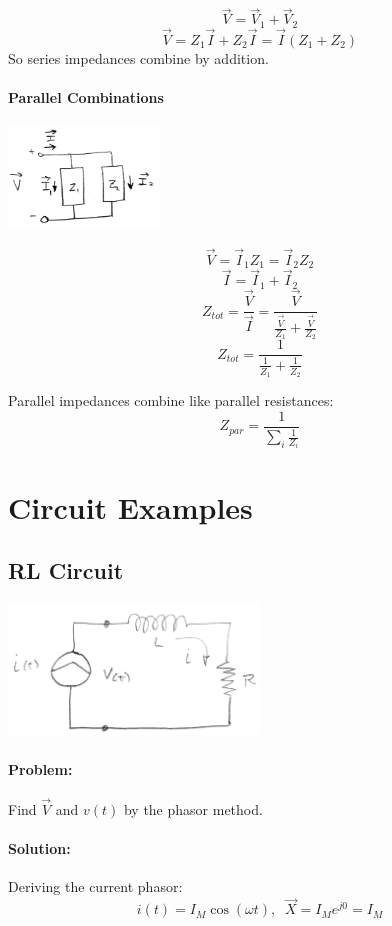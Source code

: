 \[
\vec{V} = \vec{V}_1  + \vec{V}_2
\]
\[
\vec{V} = Z_1\vec{I}  + Z_2\vec{I} = \vec{I}(Z_1+Z_2)
\]
So series impedances combine by addition.

\paragraph{Parallel Combinations}
\includegraphics[width=0.3\textwidth]{figsChapt02/IM00849.png}

\[
\vec{V} = \vec{I}_1 Z_1 =  \vec{I}_2 Z_2
\]
\[
\vec{I} = \vec{I}_1 +  \vec{I}_2
\]
\[
Z_{tot} = \frac {\vec{V}}  {\vec{I}}
= \frac {\vec{V}}  {\frac {\vec{V}}  {Z_1} + \frac {\vec{V}}  {Z_2} }
\]
\[
Z_{tot} = \frac {1}  {\frac {1}  {Z_1}  + \frac {1}  {Z_2}  }
\]

Parallel impedances combine like parallel resistances:
\[
Z_{par} = \frac {1}  {\sum\limits_{i} \frac {1}  {Z_i} }
\]





\section{Circuit Examples}


\subsection{RL Circuit}\label{seriesRLckt}

\includegraphics[width=0.5\textwidth]{figsChapt02/RI98726.png}

\paragraph{Problem:} Find $\vec{V}$ and $v(t)$ by the phasor method.
\paragraph{Solution:}
Deriving the current phasor:
\[
i(t) = I_M\cos(\omega t),\;\; \vec{X} = I_Me^{j0} = I_M
\]

